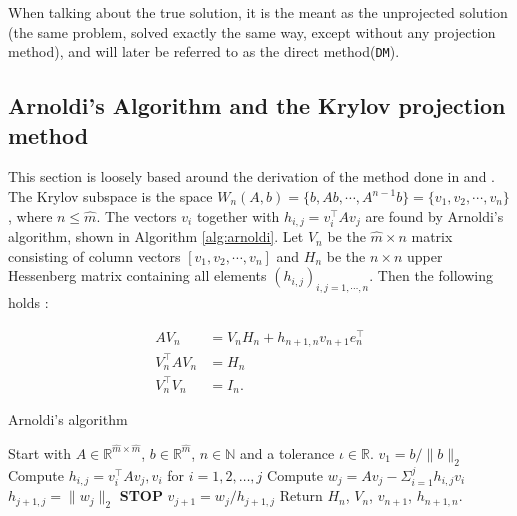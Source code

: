 \noindent When talking about the true solution, it is the meant as the unprojected solution (the same problem, solved exactly the same way, except without any projection method), and will later be referred to as the direct method(\texttt{DM}).
\subsection{Arnoldi's Algorithm and the Krylov projection method} %
This section is loosely based around the derivation of the method done in \cite{elena} and \cite{min}. \\

\noindent The Krylov subspace is the space $W_n (A,b) = \{b,Ab, \cdots, A^{n-1}b\} = \{v_1,v_2,\cdots,v_n\} $, where $n \leq \hat{m}$.
The vectors $v_i$ together with $h_{i,j} = v_i^\top Av_j$ are found by Arnoldi's algorithm, shown in Algorithm \ref{alg:arnoldi}. Let $V_n$ be the $\hat{m} \times n$ matrix consisting of column vectors $[v_1,v_2,\cdots,v_n ] $ and $H_n$ be the $n \times n$ upper Hessenberg matrix containing all elements $(h_{i,j})_{i,j=1,\cdots,n}$. Then the following holds \cite{kryprop}:

\begin{equation}
\begin{aligned}
AV_n & = V_n H_n + h_{n+1,n}v_{n+1}e^\top_n  \\
V^{\top}_n AV_n &= H_n  \\
V_n^{\top} V_n &= I_n. 
\label{eqn:propA}
\end{aligned}
\end{equation}

\begin{algorithm} [h!]
\begin{algorithmic} \caption{Arnoldi's algorithm\cite{arnold}} \label{alg:arnoldi}  
\STATE Start with $A \in \mathbb{R}^{\hat{m} \times \hat{m}}$, $b \in \mathbb{R}^{\hat{m}}$, $n \in \mathbb{N}$ and a tolerance $\iota \in \mathbb{R}$.
\STATE $v_1 = b/\|b \|_2$
   \STATE Compute $h_{i,j} =  v_i^{\top}Av_j,v_i $ for $i = 1,2,\dots, j$
    \STATE Compute $w_j = A v_j - \Sigma_{i=1}^{j} h_{i,j}v_i $
    \STATE $h_{j+1,j} = \| w_j \|_2$
        \STATE\textbf{STOP}
    \ENDIF 
   \STATE $v_{j+1} = w_j/h_{j+1,j}$
\ENDFOR
\STATE Return $H_n$, $V_n$, $v_{n+1}$, $h_{n+1,n}$.
\end{algorithmic} 
\end{algorithm}



